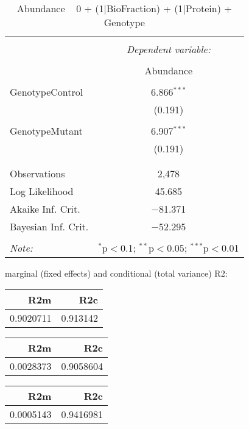 \documentclass[11pt]{report}
\begin{document}
\begin{table}[!htbp] \centering 
  \caption{Abundance ~ 0 + (1|BioFraction) + (1|Protein) + Genotype} 
  \label{} 
\begin{tabular}{@{\extracolsep{5pt}}lc} 
\\[-1.8ex]\hline 
\hline \\[-1.8ex] 
 & \multicolumn{1}{c}{\textit{Dependent variable:}} \\ 
\cline{2-2} 
\\[-1.8ex] & Abundance \\ 
\hline \\[-1.8ex] 
 GenotypeControl & 6.866$^{***}$ \\ 
  & (0.191) \\ 
  & \\ 
 GenotypeMutant & 6.907$^{***}$ \\ 
  & (0.191) \\ 
  & \\ 
\hline \\[-1.8ex] 
Observations & 2,478 \\ 
Log Likelihood & 45.685 \\ 
Akaike Inf. Crit. & $-$81.371 \\ 
Bayesian Inf. Crit. & $-$52.295 \\ 
\hline 
\hline \\[-1.8ex] 
\textit{Note:}  & \multicolumn{1}{r}{$^{*}$p$<$0.1; $^{**}$p$<$0.05; $^{***}$p$<$0.01} \\ 
\end{tabular} 
\end{table} 
marginal (fixed effects) and conditional (total variance) R2:

\begin{tabular}{r|r}
\hline
R2m & R2c\\
\hline
0.9020711 & 0.913142\\
\hline
\end{tabular}

\begin{tabular}{r|r}
\hline
R2m & R2c\\
\hline
0.0028373 & 0.9058604\\
\hline
\end{tabular}

\begin{tabular}{r|r}
\hline
R2m & R2c\\
\hline
0.0005143 & 0.9416981\\
\hline
\end{tabular}
\end{document}
